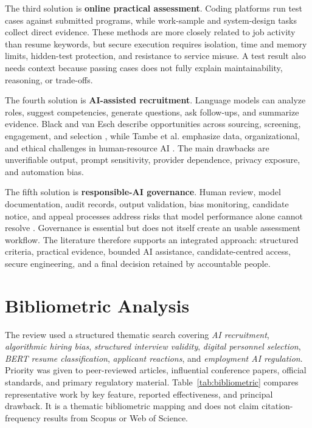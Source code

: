 \documentclass[12pt,a4paper,oneside]{report}
\renewcommand{\cite}[1]{}
\begin{document}
The third solution is \textbf{online practical assessment}. Coding platforms run test
cases against submitted programs, while work-sample and system-design tasks collect
direct evidence. These methods are more closely related to job activity than resume
keywords, but secure execution requires isolation, time and memory limits, hidden-test
protection, and resistance to service misuse. A test result also needs context because
passing cases does not fully explain maintainability, reasoning, or trade-offs.

The fourth solution is \textbf{AI-assisted recruitment}. Language models can analyze
roles, suggest competencies, generate questions, ask follow-ups, and summarize
evidence. Black and van Esch describe opportunities across sourcing, screening,
engagement, and selection \cite{black2020}, while Tambe et al. emphasize data,
organizational, and ethical challenges in human-resource AI \cite{tambe2019}. The main
drawbacks are unverifiable output, prompt sensitivity, provider dependence, privacy
exposure, and automation bias.

The fifth solution is \textbf{responsible-AI governance}. Human review, model
documentation, audit records, output validation, bias monitoring, candidate notice,
and appeal processes address risks that model performance alone cannot resolve
\cite{nist2023,eu2024}. Governance is essential but does not itself create an usable
assessment workflow. The literature therefore supports an integrated approach:
structured criteria, practical evidence, bounded AI assistance, candidate-centred
access, secure engineering, and a final decision retained by accountable people.

\clearpage
\section{Bibliometric Analysis}

The review used a structured thematic search covering \textit{AI recruitment},
\textit{algorithmic hiring bias}, \textit{structured interview validity},
\textit{digital personnel selection}, \textit{BERT resume classification},
\textit{applicant reactions}, and \textit{employment AI regulation}. Priority was
given to peer-reviewed articles, influential conference papers, official standards,
and primary regulatory material. Table~\ref{tab:bibliometric} compares representative
work by key feature, reported effectiveness, and principal drawback. It is a thematic
bibliometric mapping and does not claim citation-frequency results from Scopus or Web
of Science.
\end{document}
